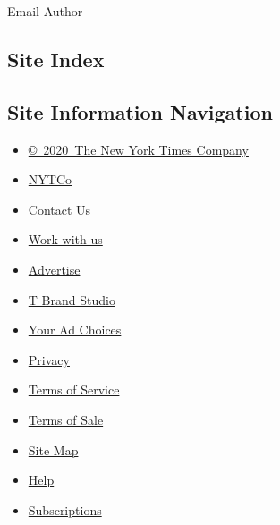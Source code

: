 Email Author

\hypertarget{site-index}{%
\subsection{Site Index}\label{site-index}}

\hypertarget{site-information-navigation}{%
\subsection{Site Information
Navigation}\label{site-information-navigation}}

\begin{itemize}
\tightlist
\item
  \href{https://help.nytimes3xbfgragh.onion/hc/en-us/articles/115014792127-Copyright-notice}{©~2020~The
  New York Times Company}
\end{itemize}

\begin{itemize}
\tightlist
\item
  \href{https://www.nytco.com/}{NYTCo}
\item
  \href{https://help.nytimes3xbfgragh.onion/hc/en-us/articles/115015385887-Contact-Us}{Contact
  Us}
\item
  \href{https://www.nytco.com/careers/}{Work with us}
\item
  \href{https://nytmediakit.com/}{Advertise}
\item
  \href{http://www.tbrandstudio.com/}{T Brand Studio}
\item
  \href{https://www.nytimes3xbfgragh.onion/privacy/cookie-policy\#how-do-i-manage-trackers}{Your
  Ad Choices}
\item
  \href{https://www.nytimes3xbfgragh.onion/privacy}{Privacy}
\item
  \href{https://help.nytimes3xbfgragh.onion/hc/en-us/articles/115014893428-Terms-of-service}{Terms
  of Service}
\item
  \href{https://help.nytimes3xbfgragh.onion/hc/en-us/articles/115014893968-Terms-of-sale}{Terms
  of Sale}
\item
  \href{https://spiderbites.nytimes3xbfgragh.onion}{Site Map}
\item
  \href{https://help.nytimes3xbfgragh.onion/hc/en-us}{Help}
\item
  \href{https://www.nytimes3xbfgragh.onion/subscription?campaignId=37WXW}{Subscriptions}
\end{itemize}
